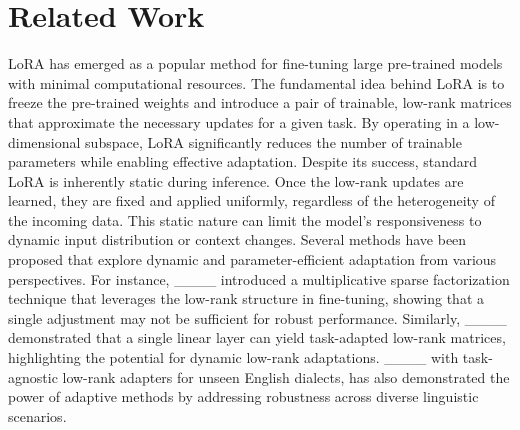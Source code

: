 \section{Related Work}
LoRA has emerged as a popular method for fine-tuning large pre-trained models with minimal computational resources. The fundamental idea behind LoRA is to freeze the pre-trained weights and introduce a pair of trainable, low-rank matrices that approximate the necessary updates for a given task. By operating in a low-dimensional subspace, LoRA significantly reduces the number of trainable parameters while enabling effective adaptation. Despite its success, standard LoRA is inherently static during inference. Once the low-rank updates are learned, they are fixed and applied uniformly, regardless of the heterogeneity of the incoming data. This static nature can limit the model's responsiveness to dynamic input distribution or context changes. Several methods have been proposed that explore dynamic and parameter-efficient adaptation from various perspectives. For instance, ____ introduced a multiplicative sparse factorization technique that leverages the low-rank structure in fine-tuning, showing that a single adjustment may not be sufficient for robust performance. Similarly, ____ demonstrated that a single linear layer can yield task-adapted low-rank matrices, highlighting the potential for dynamic low-rank adaptations. ____ with task-agnostic low-rank adapters for unseen English dialects, has also demonstrated the power of adaptive methods by addressing robustness across diverse linguistic scenarios.

